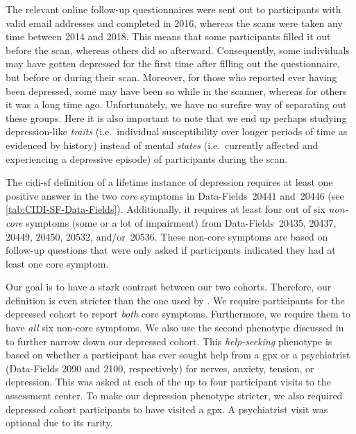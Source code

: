 The relevant online follow-up questionnaires were sent out to participants with valid email addresses and completed in 2016, whereas the scans were taken any time between 2014 and 2018.
This means that some participants filled it out before the scan, whereas others did so afterward.
Consequently, some individuals may have gotten depressed for the first time after filling out the questionnaire, but before or during their scan.
Moreover, for those who reported ever having been depressed, some may have been so while in the scanner, whereas for others it was a long time ago.
Unfortunately, we have no surefire way of separating out these groups.
Here it is also important to note that we end up perhaps studying depression-like \emph{traits} (i.e.~individual susceptibility over longer periods of time as evidenced by history) instead of mental \emph{states} (i.e.~currently affected and experiencing a depressive episode) of participants during the scan.

The \gls{cidi-sf} definition of a lifetime instance of depression requires at least one positive answer in the two \emph{core} symptoms in Data-Fields~20441 and~20446 (see \cref{tab:CIDI-SF-Data-Fields}).
Additionally, it requires at least four out of six \emph{non-core} symptoms (some or a lot of impairment) from Data-Fields~20435, 20437, 20449, 20450, 20532, and/or~20536.
These non-core symptoms are based on follow-up questions that were only asked if participants indicated they had at least one core symptom.



Our goal is to have a stark contrast between our two cohorts.
Therefore, our definition is even stricter than the one used by \textcite{Howard2020}.
We require participants for the depressed cohort to report \emph{both} core symptoms.
Furthermore, we require them to have \emph{all} six non-core symptoms.
We also use the second phenotype discussed in \textcite{Howard2020} to further narrow down our depressed cohort.
This \emph{help-seeking} phenotype is based on whether a participant has ever sought help from a \gls{gpx} or a psychiatrist (Data-Fields 2090 and 2100, respectively) for nerves, anxiety, tension, or depression.
This was asked at each of the up to four participant visits to the assessment center.
To make our depression phenotype stricter, we also required depressed cohort participants to have visited a \gls{gpx}.
A psychiatrist visit was optional due to its rarity.


